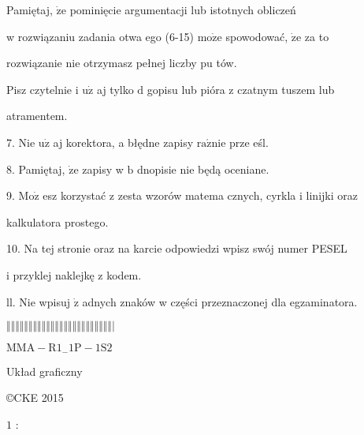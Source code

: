\documentclass[a4paper,12pt]{article}
\begin{document}
Pamiętaj, $\dot{\mathrm{z}}\mathrm{e}$ pominięcie argumentacji lub istotnych obliczeń

w rozwiązaniu zadania otwa ego (6-15) $\mathrm{m}\mathrm{o}\dot{\mathrm{z}}\mathrm{e}$ spowodować, $\dot{\mathrm{z}}\mathrm{e}$ za to

rozwiązanie nie otrzymasz pełnej liczby pu tów.

Pisz czytelnie i $\mathrm{u}\dot{\mathrm{z}}$ aj tylko $\mathrm{d}$ gopisu lub pióra z czatnym tuszem lub

atramentem.

7. Nie $\mathrm{u}\dot{\mathrm{z}}$ aj korektora, a błędne zapisy $\mathrm{r}\mathrm{a}\acute{\mathrm{z}}\mathrm{n}\mathrm{i}\mathrm{e}$ prze eśl.

8. Pamiętaj, $\dot{\mathrm{z}}\mathrm{e}$ zapisy w $\mathrm{b}$ dnopisie nie będą oceniane.

9. $\mathrm{M}\mathrm{o}\dot{\mathrm{z}}$ esz korzystać z zesta wzorów matema cznych, cyrkla i linijki oraz

kalkulatora prostego.

10. Na tej stronie oraz na karcie odpowiedzi wpisz swój numer PESEL

i przyklej naklejkę z kodem.

ll. Nie wpisuj $\dot{\mathrm{z}}$ adnych znaków w części przeznaczonej dla egzaminatora.

$\Vert\Vert\Vert\Vert\Vert\Vert\Vert\Vert\Vert\Vert\Vert\Vert\Vert\Vert\Vert\Vert\Vert\Vert\Vert\Vert\Vert\Vert\Vert\Vert|$

$\mathrm{M}\mathrm{M}\mathrm{A}-\mathrm{R}1_{-}1\mathrm{P}-1\mathrm{S}2$

Układ graficzny

\copyright CKE 2015

$1$ :
\end{document}
